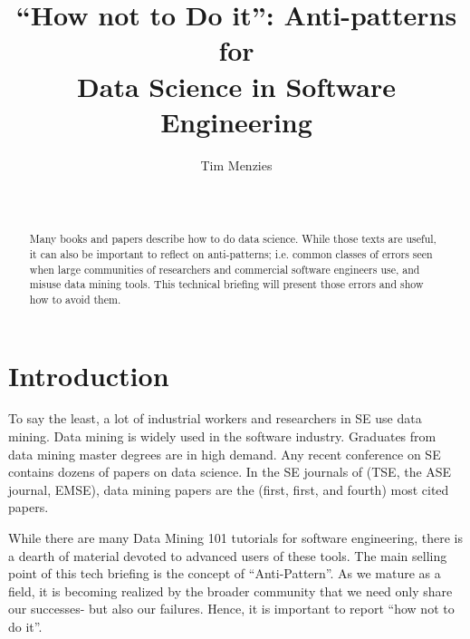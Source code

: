 \documentclass{sig-alternate}
\begin{document}

\title{``How not to Do it'': Anti-patterns for \\Data Science in Software Engineering}

\author{ 
Tim Menzies\\
       \\
       \\
}

\date{}

\maketitle
 

\begin{abstract}
Many books and papers describe how to do data science. While those texts are useful, it can also be important to reflect on anti-patterns; i.e. common classes of errors seen when large communities of researchers and commercial software engineers use, and misuse data mining tools. This technical briefing will present those errors and show how to avoid them.
\end{abstract}






\section{Introduction}
To say the least, a lot of industrial workers and researchers in SE use data mining. Data mining is widely used in the software industry. Graduates from data mining master degrees are in high demand. Any recent conference on SE contains dozens of papers on data science. In the SE journals of (TSE, the ASE journal, EMSE), data mining papers are the (first, first, and fourth) most cited papers.

While there are many Data Mining 101 tutorials for software engineering, there is a dearth of material devoted to advanced users of these tools. The main selling point of this tech briefing is the concept of ``Anti-Pattern''. As we mature as a field, it is becoming realized by the broader community that we need only share our successes- but also our failures. Hence, it is important to report ``how not to do it''.
\end{document}

